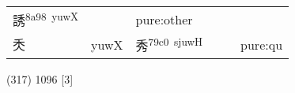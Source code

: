 \documentclass[14pt,a4paper]{scrartcl}
\begin{document}
\begin{longtable}[c]{@{}llllll@{}}
\begin{minipage}[t]{0.14\columnwidth}
誘\textsuperscript{8a98~yuwX}
\strut\end{minipage} &
\begin{minipage}[t]{0.14\columnwidth}\raggedright\strut
\strut\end{minipage} &
\begin{minipage}[t]{0.14\columnwidth}\raggedright\strut
pure:other
\strut\end{minipage}\tabularnewline
\begin{minipage}[t]{0.14\columnwidth}\raggedright\strut
秂
\strut\end{minipage} &
\begin{minipage}[t]{0.14\columnwidth}\raggedright\strut
yuwX
\strut\end{minipage} &
\begin{minipage}[t]{0.14\columnwidth}\raggedright\strut
秀\textsuperscript{79c0~sjuwH}
\strut\end{minipage} &
\begin{minipage}[t]{0.14\columnwidth}\raggedright\strut
\strut\end{minipage} &
\begin{minipage}[t]{0.14\columnwidth}\raggedright\strut
\strut\end{minipage} &
\begin{minipage}[t]{0.14\columnwidth}\raggedright\strut
pure:qu
\strut\end{minipage}\tabularnewline
\bottomrule
\end{longtable}

(317) 1096 {[}3{]}
\end{document}
